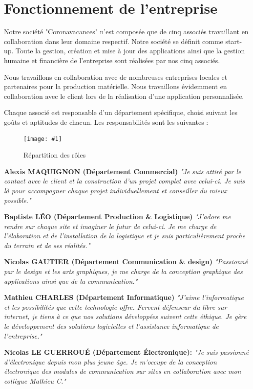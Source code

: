 \documentclass{report}
\newcommand{\iImage}[3]{\begin{figure}[H]\centering\texttt{[image: \#1]}\caption{#2}\end{figure}}
\newcommand{\n}{\newline}
\newcommand{\smallSkip}{\vskip 0.5cm}
\begin{document}
\section{Fonctionnement de l'entreprise}

Notre société "Coronavacances" n'est composée que de cinq associés travaillant en collaboration dans leur domaine respectif. Notre société se définit comme start-up. 
Toute la gestion, création et mise à jour des applications ainsi que la gestion humaine et financière de l'entreprise sont réalisées par nos cinq associés.\smallSkip

Nous travaillons en collaboration avec de nombreuses entreprises locales et partenaires pour la production matérielle.
Nous travaillons évidemment en collaboration avec le client lors de la réalisation d'une application personnalisée.\smallSkip
 
Chaque associé est responsable d'un département spécifique, choisi suivant les goûts et aptitudes de chacun. Les responsabilités sont les suivantes : \smallSkip


\iImage{Images/membres.png}{Répartition des rôles}{0.18}

\textbf{Alexis MAQUIGNON (Département Commercial)} \textit{\n "Je suis attiré par le contact avec le client et la construction d'un projet complet avec celui-ci. Je suis là pour accompagner chaque projet individuellement et conseiller du mieux possible."} \n

\textbf{Baptiste LÉO (Département Production & Logistique)} \textit{\n "J'adore me rendre sur chaque site et imaginer le futur de celui-ci. Je me charge de l'élaboration et de l'installation de la logistique et je suis particulièrement proche du terrain et de ses réalités."} \n

\textbf{Nicolas GAUTIER (Département Communication & design)} \textit{\n "Passionné par le design et les arts graphiques, je me charge de la conception graphique des applications ainsi que de la communication."} \n

\textbf{Mathieu CHARLES (Département Informatique)} \textit{\n "J'aime l'informatique et les possibilités que cette technologie offre. Fervent défenseur du libre sur internet, je tiens à ce que nos solutions développées suivent cette éthique. Je gère le développement des solutions logicielles et l'assistance informatique de l'entreprise."} \n

\textbf{Nicolas LE GUERROUÉ (Département Électronique):} \textit{"Je suis passionné d'électronique depuis mon plus jeune âge. Je m'occupe de la conception électronique des modules de communication sur sites en collaboration avec mon collègue Mathieu C."}\n
\end{document}
